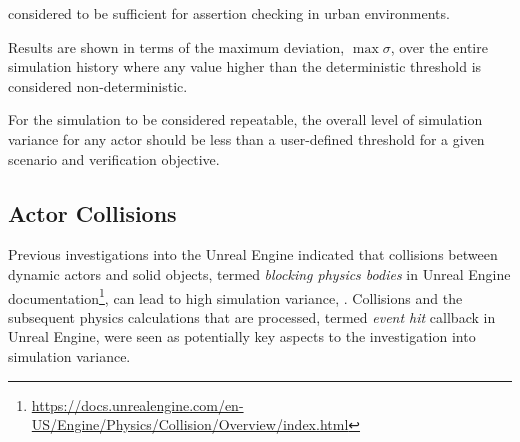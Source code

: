 \documentclass[letterpaper, 10 pt, journal, twoside]{IEEEtran}
\begin{document}
considered to be sufficient for assertion checking in urban environments. 
%

Results are shown in terms of the maximum deviation, $\max\sigma$, over the entire simulation history %
where any value higher than the deterministic threshold is considered non-deterministic. 



For the simulation to be considered repeatable, the overall level of simulation variance 
for any actor should be less than a user-defined threshold for a given scenario and verification objective. 
%

\subsection{Actor Collisions}\label{S:Actor_Collisions}
Previous investigations into the Unreal Engine indicated that collisions between dynamic actors and solid objects, termed \textit{blocking physics bodies} in Unreal Engine documentation\footnote{\url{https://docs.unrealengine.com/en-US/Engine/Physics/Collision/Overview/index.html}}, can lead to high simulation variance, \cite{TSLUnrealEngineTesting}. 
%
Collisions and the subsequent physics calculations that are processed, termed \textit{event hit} callback in Unreal Engine, were seen as potentially key aspects to the investigation into simulation variance.
\end{document}
